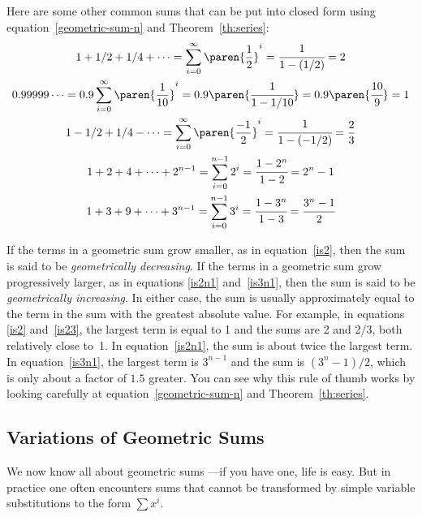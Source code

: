 Here are some other common sums that can be put into closed form using
equation~\ref{geometric-sum-n} and Theorem~\ref{th:series}:
\begingroup {}
\begin{gather}
1 + 1/2 + 1/4 + \cdots = \sum_{i=0}^\infty \paren{\frac{1}{2}}^i %
= \cfrac{1}{1-(1/2)} = 2 \label{is2} \\ 0.99999\dots = 0.9
\sum_{i=0}^{\infty} \paren{\frac{1}{10}}^i = 0.9
\paren{\cfrac{1}{1-1/10}} = 0.9 \paren{\cfrac{10}{9}} = 1 \label{is1}
\\ 1 - 1/2 + 1/4 - \cdots = \sum_{i=0}^\infty \paren{\frac{-1}{2}}^i =
\cfrac{1}{1-(-1/2)} = \frac{2}{3} \label{is23} \\ 1 + 2 + 4 + \cdots +
2^{n-1} = \sum_{i=0}^{n-1} 2^i = \cfrac{1 - 2^n}{1 - 2} = 2^n -
1 \label{is2n1} \\ 1 + 3 + 9 + \cdots + 3^{n-1} = \sum_{i=0}^{n-1} 3^i
= \cfrac{1 - 3^n}{1 - 3} = \cfrac{3^n - 1}{2} \label{is3n1}
\end{gather}
\endgroup

If the terms in a geometric sum grow smaller, as in
equation~\ref{is2}, then the sum is said to be \emph{geometrically
  decreasing}.  If the terms in a geometric sum grow progressively
larger, as in equations \ref{is2n1} and~\ref{is3n1}, then the sum is
said to be \emph{geometrically increasing}.  In either case, the sum
is usually approximately equal to the term in the sum with the
greatest absolute value.  For example, in equations \ref{is2}
and~\ref{is23}, the largest term is equal to 1 and the sums are 2 and
2/3, both relatively close to~1.  In equation~\ref{is2n1}, the sum is
about twice the largest term.  In equation~\ref{is3n1}, the largest
term is $3^{n-1}$ and the sum is $(3^n-1)/2$, which is only about a
factor of $1.5$ greater.  You can see why this rule of thumb works by
looking carefully at equation~\ref{geometric-sum-n} and
Theorem~\ref{th:series}.

\subsection{Variations of Geometric Sums}

We now know all about geometric sums ---if you have one, life is easy.
But in practice one often encounters sums that cannot be transformed
by simple variable substitutions to the form $\sum x^i$.

